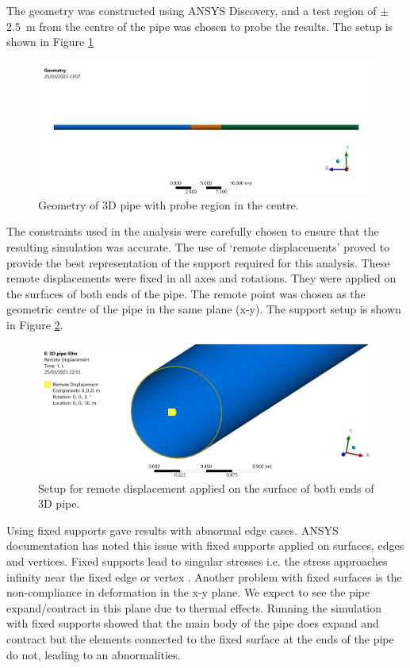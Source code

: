 The geometry was constructed using ANSYS Discovery, and a test region of $\pm$ \SI{2.5}{\meter} from the centre of the pipe was chosen to probe the results. The setup is shown in Figure \ref{part1cSplitBody}
\begin{figure}[H]
    \centering
    \includegraphics[width=\textwidth]{img/part1c-3.png}
    \caption{Geometry of 3D pipe with probe region in the centre.}
    \label{part1cSplitBody}
\end{figure}
The constraints used in the analysis were carefully chosen to ensure that the resulting simulation was accurate. The use of `remote displacements' proved to provide the best representation of the support required for this analysis. These remote displacements were fixed in all axes and rotations. They were applied on the surfaces of both ends of the pipe. The remote point was chosen as the geometric centre of the pipe in the same plane (x-y). The support setup is shown in Figure \ref{supports}.
\begin{figure}[H]
    \centering
    \includegraphics[width = \textwidth]{img/part1c-4.png}
    \caption{Setup for remote displacement applied on the surface of both ends of 3D pipe.}
    \label{supports}
\end{figure}
Using fixed supports gave results with abnormal edge cases. ANSYS documentation has noted this issue with fixed supports applied on surfaces, edges and vertices. Fixed supports lead to singular stresses i.e. the stress approaches infinity near the fixed edge or vertex \cite{ansysDocumentation}. Another problem with fixed surfaces is the non-compliance in deformation in the x-y plane. We expect to see the pipe expand/contract in this plane due to thermal effects. Running the simulation with fixed supports showed that the main body of the pipe does expand and contract but the elements connected to the fixed surface at the ends of the pipe do not, leading to an abnormalities.


